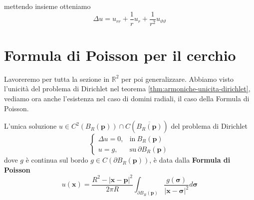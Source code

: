 \documentclass[10pt,a4paper,twoside,openright]{book}
\newcommand{\x}{\mathbf{x}}
\begin{document}
mettendo insieme otteniamo
\begin{equation*}
\Delta u=u_{rr} +\frac{1}{r} u_{r} +\frac{1}{r^{2}} u_{\vartheta \vartheta }
\end{equation*}
\section{Formula di Poisson per il cerchio}
Lavoreremo per tutta la sezione in $\displaystyle \mathbb{R}^{2}$ per poi generalizzare.
Abbiamo visto l'unicità del problema di Dirichlet nel teorema \ref{thm:armoniche-unicita-dirichlet}, vediamo ora anche l'esistenza nel caso di domini radiali, il caso della Formula di Poisson.
\begin{theorem}
L'unica soluzione $u\in C^{2}(B_{R}(\mathbf{p})) \cap C\left(\overline{B_{R}(\mathbf{p})}\right)$ del problema di Dirichlet
\begin{equation*}
\begin{cases}
\Delta u=0, & \text{in} \ B_{R}(\mathbf{p})\\
u=g, & \text{su} \ \partial B_{R}(\mathbf{p})
\end{cases}
\end{equation*}
dove $g$ è continua sul bordo $g\in C( \partial B_{R}(\mathbf{p}))$, è data dalla \textbf{Formula di Poisson}
\begin{equation}
\label{eq:poisson-cerchio}
u(\x) =\frac{R^{2} -| \x-\mathbf{p}| ^{2}}{2\pi R}\int _{\partial B_{R}(\mathbf{p})}\frac{g(\bm{\sigma})}{| \x-\bm{\sigma} | ^{2}} d\bm{\sigma }
\end{equation}
\end{theorem}
\end{document}
